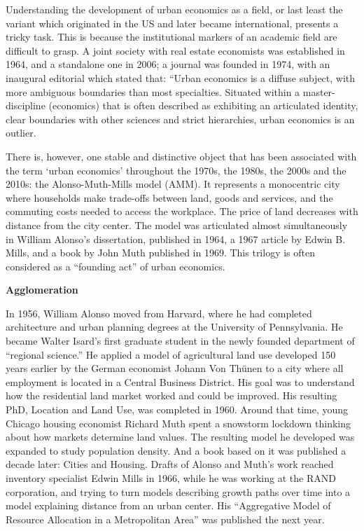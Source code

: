 \documentclass[
]{book}
\begin{document}
Understanding the development of urban economics as a field, or last least the variant which originated in the US and later became international, presents a tricky task. This is because the institutional markers of an academic field are difficult to grasp. A joint society with real estate economists was established in 1964, and a standalone one in 2006; a journal was founded in 1974, with an inaugural editorial which stated that: ``Urban economics is a diffuse subject, with more ambiguous boundaries than most specialties.
Situated within a master-discipline (economics) that is often described as exhibiting an articulated identity, clear boundaries with other sciences and strict hierarchies, urban economics is an outlier.

There is, however, one stable and distinctive object that has been associated with the term `urban economics' throughout the 1970s, the 1980s, the 2000s and the 2010s: the Alonso-Muth-Mills model (AMM). It represents a monocentric city where households make trade-offs between land, goods and services, and the commuting costs needed to access the workplace. The price of land decreases with distance from the city center. The model was articulated almost simultaneously in William Alonso's dissertation, published in 1964, a 1967 article by Edwin B. Mills, and a book by John Muth published in 1969. This trilogy is often considered as a ``founding act'' of urban economics.

\textbf{Agglomeration}

In 1956, William Alonso moved from Harvard, where he had completed architecture and urban planning degrees at the University of Pennsylvania. He became Walter Isard's first graduate student in the newly founded department of ``regional science.'' He applied a model of agricultural land use developed 150 years earlier by the German economist Johann Von Thünen to a city where all employment is located in a Central Business District. His goal was to understand how the residential land market worked and could be improved. His resulting PhD, Location and Land Use, was completed in 1960. Around that time, young Chicago housing economist Richard Muth spent a snowstorm lockdown thinking about how markets determine land values. The resulting model he developed was expanded to study population density. And a book based on it was published a decade later: Cities and Housing. Drafts of Alonso and Muth's work reached inventory specialist Edwin Mills in 1966, while he was working at the RAND corporation, and trying to turn models describing growth paths over time into a model explaining distance from an urban center. His ``Aggregative Model of Resource Allocation in a Metropolitan Area'' was published the next year.
\end{document}
